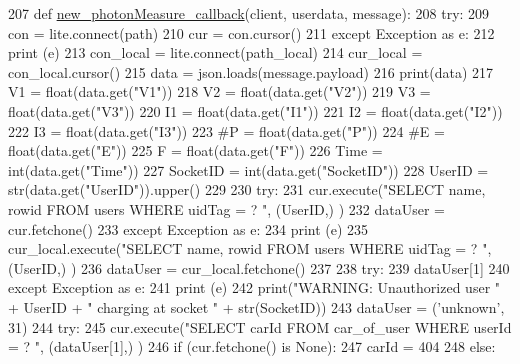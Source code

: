 \begin{DoxyCode}
207 \textcolor{keyword}{def }\hyperlink{namespace_s_q_lfunction_a356dd5906768f7dd778408f466e9f9b4}{new\_photonMeasure\_callback}(client, userdata, message):
208     \textcolor{keywordflow}{try}:
209         con = lite.connect(path)
210         cur = con.cursor()
211     \textcolor{keywordflow}{except} Exception \textcolor{keyword}{as} e:
212         \textcolor{keywordflow}{print} (e)
213     con\_local = lite.connect(path\_local)
214     cur\_local = con\_local.cursor()
215     data = json.loads(message.payload)    
216     print(data)
217     V1 = float(data.get(\textcolor{stringliteral}{"V1"}))
218     V2 = float(data.get(\textcolor{stringliteral}{"V2"}))
219     V3 = float(data.get(\textcolor{stringliteral}{"V3"}))
220     I1 = float(data.get(\textcolor{stringliteral}{"I1"}))
221     I2 = float(data.get(\textcolor{stringliteral}{"I2"}))
222     I3 = float(data.get(\textcolor{stringliteral}{"I3"}))
223     \textcolor{comment}{#P = float(data.get("P"))}
224     \textcolor{comment}{#E = float(data.get("E"))}
225     F = float(data.get(\textcolor{stringliteral}{"F"}))
226     Time = int(data.get(\textcolor{stringliteral}{"Time"}))
227     SocketID = int(data.get(\textcolor{stringliteral}{"SocketID"}))
228     UserID = str(data.get(\textcolor{stringliteral}{"UserID"})).upper()
229     
230     \textcolor{keywordflow}{try}:
231         cur.execute(\textcolor{stringliteral}{"SELECT name, rowid FROM users WHERE uidTag = ? "}, (UserID,) )
232         dataUser = cur.fetchone()
233     \textcolor{keywordflow}{except} Exception \textcolor{keyword}{as} e:
234         \textcolor{keywordflow}{print} (e)
235         cur\_local.execute(\textcolor{stringliteral}{"SELECT name, rowid FROM users WHERE uidTag = ? "}, (UserID,) )
236         dataUser = cur\_local.fetchone()
237         
238     \textcolor{keywordflow}{try}:
239         dataUser[1]
240     \textcolor{keywordflow}{except} Exception \textcolor{keyword}{as} e:
241         \textcolor{keywordflow}{print} (e)
242         print(\textcolor{stringliteral}{"WARNING: Unauthorized user "} + UserID + \textcolor{stringliteral}{" charging at socket "} + str(SocketID))
243         dataUser = (\textcolor{stringliteral}{'unknown'}, 31)                
244     \textcolor{keywordflow}{try}:
245         cur.execute(\textcolor{stringliteral}{"SELECT carId FROM car\_of\_user WHERE userId = ? "}, (dataUser[1],) )
246         \textcolor{keywordflow}{if} (cur.fetchone() \textcolor{keywordflow}{is} \textcolor{keywordtype}{None}):
247             carId = 404
248         \textcolor{keywordflow}{else}:

\end{DoxyCode}
